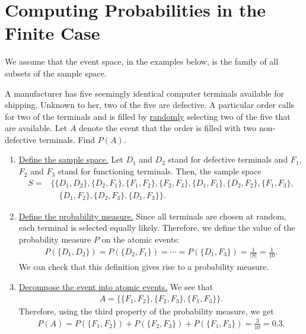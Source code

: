 

\section{Computing Probabilities in the Finite Case}
We assume that the event space, in the examples below, is the family of all subsets of the sample space.

\begin{example}
A manufacturer has five seemingly identical computer terminals available for shipping. Unknown to her, two of the five are defective. A particular order calls for two of the terminals and is filled by \underline{randomly} selecting two of the five that are available. Let $A$ denote the event that the order is filled with two non-defective terminals. Find $P(A)$.
\end{example}

\begin{sol*}
\begin{enumerate}[label=\Circled{\arabic*}]
\item \underline{Define the sample space.} Let $D_1$ and $D_2$ stand for defective terminals and $F_1$, $F_2$ and $F_3$ stand for functioning terminals. Then, the sample space
	\begin{align*}
	S =& \{ \{D_1 , D_2 \}, \{D_2 , F_1 \}, \{F_1 , F_2 \}, \{F_2 , F_3\}, \{D_1 , F_1 \}, \{D_2 , F_2 \}, \{F_1 , F_3\}, \\
	& \quad \{D_1 , F_2 \}, \{D_2 , F_3\}, \{D_1 , F_3 \} \} \text{.}
	\end{align*}
\item \underline{Define the probability measure.} Since all terminals are chosen at random, each terminal is selected equally likely. Therefore, we define the value of the probability measure $P$ on the atomic events: 
	\begin{align*}
	P ( \{ D_1 , D_2 \} ) = P ( \{ D_2 , F_1 \} ) = \cdots = P (\{ D_1 , F_3 \} ) = \frac{1}{|S|} = \frac{1}{10} .
	\end{align*}
We can check that this definition gives rise to a probability measure.
\item \underline{Decompose the event into atomic events.} We see that 
	\begin{align*}
	A = \{ \{ F_1 , F_2 \} , \{ F_2 , F_3 \} , \{ F_1 , F_3 \} \} .
	\end{align*}
Therefore, using the third property of the probability measure, we get
	\begin{align*}
	P (A) = P (\{ F_1 , F_2 \}) + P (\{ F_2 , F_3 \} ) + P (\{ F_1 , F_3 \} ) = \frac{3}{10} = 0.3 . \tag*{$\triangle$}
	\end{align*}
\end{enumerate}
\end{sol*}


